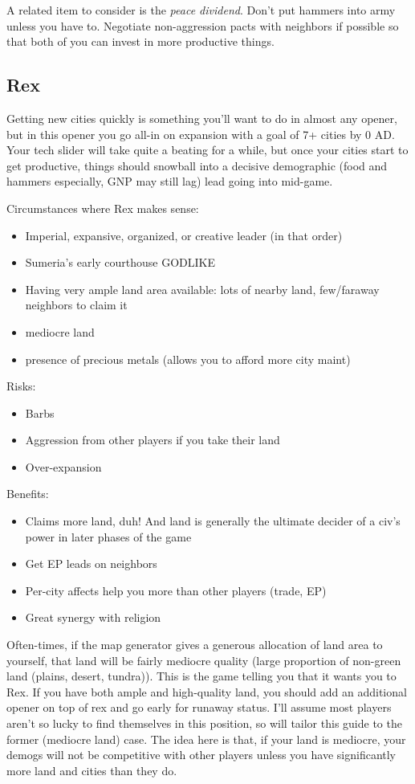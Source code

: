 \documentclass[10pt]{article}
\begin{document}
A related item to consider is the \emph{peace dividend}. Don't put hammers
into army unless you have to. Negotiate non-aggression pacts with
neighbors if possible so that both of you can invest in more
productive things.

\subsection*{Rex}

Getting new cities quickly is something you'll want to do in almost any
opener, but in this opener you go all-in on expansion with a goal of
7+ cities by 0 AD. Your tech slider will take quite a beating for a
while, but once your cities start to get productive, things should
snowball into a decisive demographic (food and hammers especially, GNP
may still lag) lead going into mid-game.

Circumstances where Rex makes sense:
\begin{itemize}
\item Imperial, expansive, organized, or creative leader (in that order)
\item Sumeria's early courthouse GODLIKE
\item Having very ample land area available: lots of nearby land, few/faraway neighbors to claim it
\item mediocre land
\item presence of precious metals (allows you to afford more city maint)
\end{itemize}

Risks:
\begin{itemize}
\item Barbs
\item Aggression from other players if you take their land
\item Over-expansion
\end{itemize}

Benefits:
\begin{itemize}
\item Claims more land, duh! And land is generally the ultimate decider of a civ's power in later phases of the game
\item Get EP leads on neighbors
\item Per-city affects help you more than other players (trade, EP)
\item Great synergy with religion
\end{itemize}

Often-times, if the map generator gives a generous allocation of land
area to yourself, that land will be fairly mediocre quality (large
proportion of non-green land (plains, desert, tundra)).  This is the
game telling you that it wants you to Rex. If you have both ample and
high-quality land, you should add an additional opener on top of rex
and go early for runaway status. I'll assume most players aren't so
lucky to find themselves in this position, so will tailor this guide
to the former (mediocre land) case.  The idea here is that, if your
land is mediocre, your demogs will not be competitive with other
players unless you have significantly more land and cities than they
do.
\end{document}
